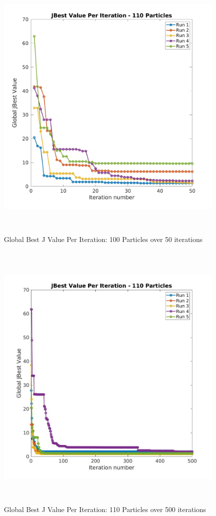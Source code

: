 \begin{figure}[H]
\includegraphics[width=\linewidth, height=13.5cm]{./jpgs/i50.jpg}
\caption{Global Best J Value Per Iteration: 100 Particles over 50 iterations}
\label{fig:gBestPer50Iter}
\end{figure}

\begin{figure}[H]
    \includegraphics[width=\linewidth, height=13.5cm]{./jpgs/i500.jpg}
    \caption{Global Best J Value Per Iteration: 110 Particles over 500 iterations}
    \label{fig:gBestPer500Iter}
    \end{figure}
